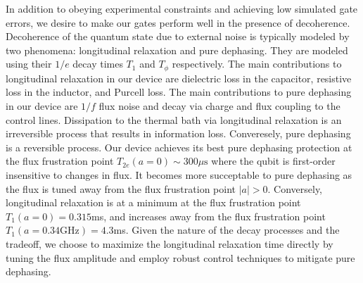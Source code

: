 In addition to obeying experimental constraints
and achieving low simulated gate errors, we desire
to make our gates perform well in the presence of decoherence.
Decoherence of the quantum state due to external noise
is typically modeled by two phenomena: longitudinal relaxation and pure dephasing.
They are modeled using their $1/e$ decay times $T_{1}$ and $T_{\phi}$ respectively.
The main contributions to longitudinal relaxation in our
device are dielectric loss in the capacitor, resistive loss in the inductor,
and Purcell loss. The main contributions to pure dephasing in our
device are $1/f$ flux noise and decay via charge and flux coupling
to the control lines.
Dissipation to the thermal bath via longitudinal
relaxation is an irreversible process
that results in information loss.
Converesely, pure dephasing is a reversible process.
Our device achieves its best pure dephasing
protection at the flux frustration point
$T_{2e}(a = 0) \sim 300 \mu\textrm{s}$
where the qubit is first-order insensitive to changes in flux.
It becomes more succeptable to pure dephasing as the flux is tuned away from the flux
frustration point $|a| > 0$. Conversely, longitudinal relaxation is at a minimum
at the flux frustration point $T_{1}(a = 0) = 0.315$ms,
and increases away from the flux frustration point
$T_{1}(a = 0.34 \textrm{GHz}) = 4.3$ms. Given the nature
of the decay processes and the tradeoff, we choose
to maximize the longitudinal relaxation time directly
by tuning the flux amplitude and employ robust control techniques to mitigate
pure dephasing.

